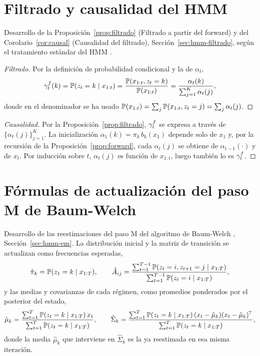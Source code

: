 \section{Filtrado y causalidad del HMM}
\label{anx:filtrado}

Desarrollo de la Proposición~\ref{prop:filtrado} (Filtrado a partir del forward) y del Corolario~\ref{cor:causal} (Causalidad del filtrado), Sección~\ref{sec:hmm-filtrado}, según el tratamiento estándar del HMM \cite{rabiner1989, bishop2006}.

\begin{proof}[Filtrado]
Por la definición de probabilidad condicional y la de $\alpha_t$,
\[
\gamma^{f}_t(k) = \mathbb{P}(z_t = k \mid x_{1:t})
= \frac{\mathbb{P}(x_{1:t}, z_t = k)}{\mathbb{P}(x_{1:t})}
= \frac{\alpha_t(k)}{\sum_{j=1}^{K} \alpha_t(j)},
\]
donde en el denominador se ha usado $\mathbb{P}(x_{1:t}) = \sum_j \mathbb{P}(x_{1:t}, z_t = j) = \sum_j \alpha_t(j)$.
\end{proof}

\begin{proof}[Causalidad]
Por la Proposición~\ref{prop:filtrado}, $\gamma^{f}_t$ se expresa a través de $\{\alpha_t(j)\}_{j=1}^{K}$. La inicialización $\alpha_1(k) = \pi_k\, b_k(x_1)$ depende solo de $x_1$ y, por la recursión de la Proposición~\ref{prop:forward}, cada $\alpha_{t}(j)$ se obtiene de $\alpha_{t-1}(\cdot)$ y de $x_t$. Por inducción sobre $t$, $\alpha_t(j)$ es función de $x_{1:t}$, luego también lo es $\gamma^{f}_t$.
\end{proof}

\section{Fórmulas de actualización del paso M de Baum-Welch}
\label{anx:em-pasos}

Desarrollo de las reestimaciones del paso M del algoritmo de Baum-Welch \cite{baum1970, rabiner1989}, Sección~\ref{sec:hmm-em}. La distribución inicial y la matriz de transición se actualizan como frecuencias esperadas,
\[
\hat{\pi}_k = \mathbb{P}(z_1 = k \mid x_{1:T}),
\qquad
\hat{A}_{ij} = \frac{\sum_{t=1}^{T-1} \mathbb{P}(z_t = i, z_{t+1} = j \mid x_{1:T})}{\sum_{t=1}^{T-1} \mathbb{P}(z_t = i \mid x_{1:T})},
\]
y las medias y covarianzas de cada régimen, como promedios ponderados por el posterior del estado,
\[
\hat{\mu}_k = \frac{\sum_{t=1}^{T} \mathbb{P}(z_t = k \mid x_{1:T})\, x_t}{\sum_{t=1}^{T} \mathbb{P}(z_t = k \mid x_{1:T})},
\qquad
\hat{\Sigma}_k = \frac{\sum_{t=1}^{T} \mathbb{P}(z_t = k \mid x_{1:T})\, (x_t - \hat{\mu}_k)(x_t - \hat{\mu}_k)^{\!\top}}{\sum_{t=1}^{T} \mathbb{P}(z_t = k \mid x_{1:T})},
\]
donde la media $\hat{\mu}_k$ que interviene en $\hat{\Sigma}_k$ es la ya reestimada en esa misma iteración.

